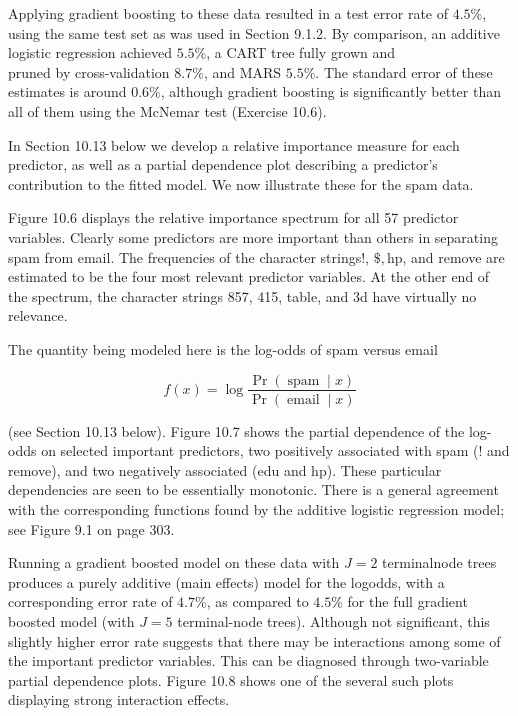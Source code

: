 \documentclass[10pt]{article}
\begin{document}
Applying gradient boosting to these data resulted in a test error rate of $4.5 \%$, using the same test set as was used in Section 9.1.2. By comparison, an additive logistic regression achieved $5.5 \%$, a CART tree fully grown and\\
pruned by cross-validation $8.7 \%$, and MARS $5.5 \%$. The standard error of these estimates is around $0.6 \%$, although gradient boosting is significantly better than all of them using the McNemar test (Exercise 10.6).

In Section 10.13 below we develop a relative importance measure for each predictor, as well as a partial dependence plot describing a predictor's contribution to the fitted model. We now illustrate these for the spam data.

Figure 10.6 displays the relative importance spectrum for all 57 predictor variables. Clearly some predictors are more important than others in separating spam from email. The frequencies of the character strings!, $\$, \mathrm{hp}$, and remove are estimated to be the four most relevant predictor variables. At the other end of the spectrum, the character strings 857, 415, table, and 3d have virtually no relevance.

The quantity being modeled here is the log-odds of spam versus email


\begin{equation*}
f(x)=\log \frac{\operatorname{Pr}(\operatorname{spam} \mid x)}{\operatorname{Pr}(\operatorname{email} \mid x)} \tag{10.24}
\end{equation*}


(see Section 10.13 below). Figure 10.7 shows the partial dependence of the log-odds on selected important predictors, two positively associated with spam (! and remove), and two negatively associated (edu and hp). These particular dependencies are seen to be essentially monotonic. There is a general agreement with the corresponding functions found by the additive logistic regression model; see Figure 9.1 on page 303.

Running a gradient boosted model on these data with $J=2$ terminalnode trees produces a purely additive (main effects) model for the logodds, with a corresponding error rate of $4.7 \%$, as compared to $4.5 \%$ for the full gradient boosted model (with $J=5$ terminal-node trees). Although not significant, this slightly higher error rate suggests that there may be interactions among some of the important predictor variables. This can be diagnosed through two-variable partial dependence plots. Figure 10.8 shows one of the several such plots displaying strong interaction effects.
\end{document}
